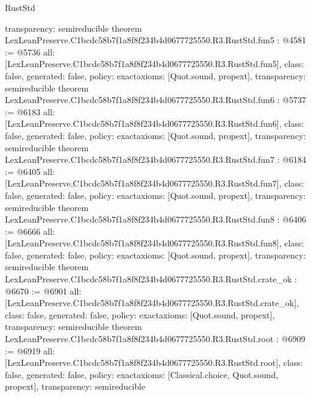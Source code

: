 \begin{lexlean}{RustStd}
\begin{coremodule}
{  transparency: semireducible
}
theorem LexLeanPreserve.C1bcdc58b7f1a8f8f234b4d0677725550.R3.RustStd.fun5 : @4581 := @5736 {
  all: [LexLeanPreserve.C1bcdc58b7f1a8f8f234b4d0677725550.R3.RustStd.fun5],
  class: false,
  generated: false,
  policy: exact{axioms: [Quot.sound, propext]},
  transparency: semireducible
}
theorem LexLeanPreserve.C1bcdc58b7f1a8f8f234b4d0677725550.R3.RustStd.fun6 : @5737 := @6183 {
  all: [LexLeanPreserve.C1bcdc58b7f1a8f8f234b4d0677725550.R3.RustStd.fun6],
  class: false,
  generated: false,
  policy: exact{axioms: [Quot.sound, propext]},
  transparency: semireducible
}
theorem LexLeanPreserve.C1bcdc58b7f1a8f8f234b4d0677725550.R3.RustStd.fun7 : @6184 := @6405 {
  all: [LexLeanPreserve.C1bcdc58b7f1a8f8f234b4d0677725550.R3.RustStd.fun7],
  class: false,
  generated: false,
  policy: exact{axioms: [Quot.sound, propext]},
  transparency: semireducible
}
theorem LexLeanPreserve.C1bcdc58b7f1a8f8f234b4d0677725550.R3.RustStd.fun8 : @6406 := @6666 {
  all: [LexLeanPreserve.C1bcdc58b7f1a8f8f234b4d0677725550.R3.RustStd.fun8],
  class: false,
  generated: false,
  policy: exact{axioms: [Quot.sound, propext]},
  transparency: semireducible
}
theorem LexLeanPreserve.C1bcdc58b7f1a8f8f234b4d0677725550.R3.RustStd.crate_ok : @6670 := @6901 {
  all: [LexLeanPreserve.C1bcdc58b7f1a8f8f234b4d0677725550.R3.RustStd.crate_ok],
  class: false,
  generated: false,
  policy: exact{axioms: [Quot.sound, propext]},
  transparency: semireducible
}
theorem LexLeanPreserve.C1bcdc58b7f1a8f8f234b4d0677725550.R3.RustStd.root : @6909 := @6919 {
  all: [LexLeanPreserve.C1bcdc58b7f1a8f8f234b4d0677725550.R3.RustStd.root],
  class: false,
  generated: false,
  policy: exact{axioms: [Classical.choice, Quot.sound, propext]},
  transparency: semireducible
}


\end{coremodule}
\end{lexlean}
